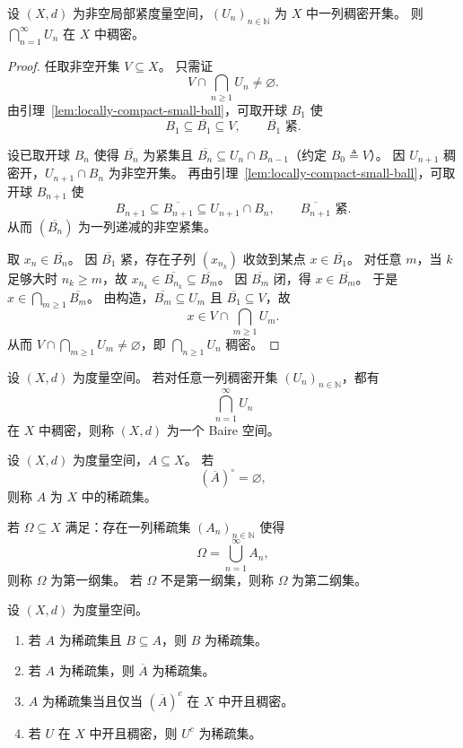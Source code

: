 \documentclass[lang=cn,a4paper,newtx,section]{elegantbook}
\begin{document}
\begin{theorem}\label{thm:baire-locally-compact}
  设 $(X,d)$ 为非空局部紧度量空间，$(U_n)_{n\in\mathbb{N}}$ 为 $X$ 中一列稠密开集。
  则 $\bigcap_{n=1}^{\infty}U_n$ 在 $X$ 中稠密。
\end{theorem}

\begin{proof}
  任取非空开集 $V\subseteq X$。
  只需证
  \[
    V\cap\bigcap_{n\ge1}U_n\ne\varnothing.
  \]
  由引理~\ref{lem:locally-compact-small-ball}，可取开球 $B_1$ 使
  \[
    B_1\subseteq\overline{B_1}\subseteq V,\qquad \overline{B_1}\text{ 紧}.
  \]

  设已取开球 $B_n$ 使得 $\overline{B_n}$ 为紧集且 $\overline{B_n}\subseteq U_n\cap B_{n-1}$（约定 $B_0\triangleq V$）。
  因 $U_{n+1}$ 稠密开，$U_{n+1}\cap B_n$ 为非空开集。
  再由引理~\ref{lem:locally-compact-small-ball}，可取开球 $B_{n+1}$ 使
  \[
    B_{n+1}\subseteq\overline{B_{n+1}}\subseteq U_{n+1}\cap B_n,\qquad \overline{B_{n+1}}\text{ 紧}.
  \]
  从而 $(\overline{B_n})$ 为一列递减的非空紧集。

  取 $x_n\in\overline{B_n}$。
  因 $\overline{B_1}$ 紧，存在子列 $(x_{n_k})$ 收敛到某点 $x\in\overline{B_1}$。
  对任意 $m$，当 $k$ 足够大时 $n_k\ge m$，故 $x_{n_k}\in\overline{B_{n_k}}\subseteq\overline{B_m}$。
  因 $\overline{B_m}$ 闭，得 $x\in\overline{B_m}$。
  于是 $x\in\bigcap_{m\ge1}\overline{B_m}$。
  由构造，$\overline{B_m}\subseteq U_m$ 且 $\overline{B_1}\subseteq V$，故
  \[
    x\in V\cap\bigcap_{m\ge1}U_m.
  \]
  从而 $V\cap\bigcap_{m\ge1}U_m\ne\varnothing$，即 $\bigcap_{n\ge1}U_n$ 稠密。
\end{proof}

\begin{definition}
  设 $(X,d)$ 为度量空间。
  若对任意一列稠密开集 $(U_n)_{n\in\mathbb{N}}$，都有
  \[
    \bigcap_{n=1}^{\infty}U_n
  \]
  在 $X$ 中稠密，则称 $(X,d)$ 为一个 Baire 空间。
\end{definition}

\begin{definition}
  设 $(X,d)$ 为度量空间，$A\subseteq X$。
  若
  \[
    (\overline{A})^\circ=\varnothing,
  \]
  则称 $A$ 为 $X$ 中的稀疏集。

  若 $\Omega\subseteq X$ 满足：存在一列稀疏集 $(A_n)_{n\in\mathbb{N}}$ 使得
  \[
    \Omega=\bigcup_{n=1}^{\infty}A_n,
  \]
  则称 $\Omega$ 为第一纲集。
  若 $\Omega$ 不是第一纲集，则称 $\Omega$ 为第二纲集。
\end{definition}

\begin{proposition}\label{prop:sparse-set-properties}
  设 $(X,d)$ 为度量空间。
  \begin{enumerate}
    \item 若 $A$ 为稀疏集且 $B\subseteq A$，则 $B$ 为稀疏集。
    \item 若 $A$ 为稀疏集，则 $\overline{A}$ 为稀疏集。
    \item $A$ 为稀疏集当且仅当 $(\overline{A})^c$ 在 $X$ 中开且稠密。
    \item 若 $U$ 在 $X$ 中开且稠密，则 $U^c$ 为稀疏集。
  \end{enumerate}
\end{proposition}
\end{document}
